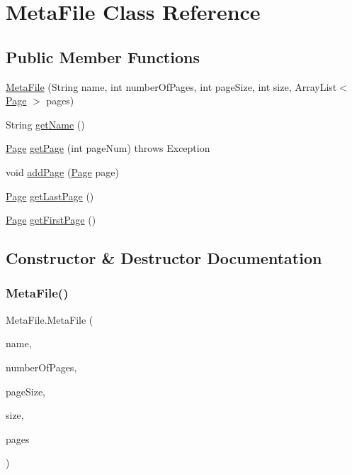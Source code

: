 \hypertarget{class_meta_file}{}\section{Meta\+File Class Reference}
\label{class_meta_file}
\subsection*{Public Member Functions}
\begin{DoxyCompactItemize}
\item 
\mbox{\hyperlink{class_meta_file_aa0e71eb6d56f1e50c2cf53c321a7b4c0}{Meta\+File}} (String name, int number\+Of\+Pages, int page\+Size, int size, Array\+List$<$ \mbox{\hyperlink{class_page}{Page}} $>$ pages)
\item 
String \mbox{\hyperlink{class_meta_file_a7704cca7da5d2e765d70d01562d6f4da}{get\+Name}} ()
\item 
\mbox{\hyperlink{class_page}{Page}} \mbox{\hyperlink{class_meta_file_a28c7cbf3f8889b484df5b11b99825a4e}{get\+Page}} (int page\+Num)  throws Exception 	
\item 
void \mbox{\hyperlink{class_meta_file_ad8fc179c2db8ceee473dbcd833d5a7bd}{add\+Page}} (\mbox{\hyperlink{class_page}{Page}} page)
\item 
\mbox{\hyperlink{class_page}{Page}} \mbox{\hyperlink{class_meta_file_adf3ad8347572a056d3a7ae730c120303}{get\+Last\+Page}} ()
\item 
\mbox{\hyperlink{class_page}{Page}} \mbox{\hyperlink{class_meta_file_a495f8b327a312ebcdd54e7dbfdd98ee5}{get\+First\+Page}} ()
\end{DoxyCompactItemize}


\subsection{Constructor \& Destructor Documentation}
\mbox{\label{class_meta_file_aa0e71eb6d56f1e50c2cf53c321a7b4c0}} 
\subsubsection{\texorpdfstring{Meta\+File()}{MetaFile()}}
{\footnotesize\ttfamily Meta\+File.\+Meta\+File (\begin{DoxyParamCaption}\item[{String}]{name,  }\item[{int}]{number\+Of\+Pages,  }\item[{int}]{page\+Size,  }\item[{int}]{size,  }\item[{Array\+List$<$ \mbox{\hyperlink{class_page}{Page}} $>$}]{pages }\end{DoxyParamCaption})\hspace{0.3cm}{\ttfamily [inline]}}

